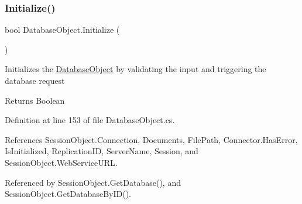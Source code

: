 \subsubsection{\texorpdfstring{Initialize()}{Initialize()}}
{\footnotesize\ttfamily bool Database\+Object.\+Initialize (\begin{DoxyParamCaption}{ }\end{DoxyParamCaption})}



Initializes the \mbox{\hyperlink{class_database_object}{Database\+Object}} by validating the input and triggering the database request 

\begin{DoxyReturn}{Returns}
Boolean
\end{DoxyReturn}


Definition at line 153 of file Database\+Object.\+cs.



References Session\+Object.\+Connection, Documents, File\+Path, Connector.\+Has\+Error, Is\+Initialized, Replication\+ID, Server\+Name, Session, and Session\+Object.\+Web\+Service\+U\+RL.



Referenced by Session\+Object.\+Get\+Database(), and Session\+Object.\+Get\+Database\+By\+I\+D().



